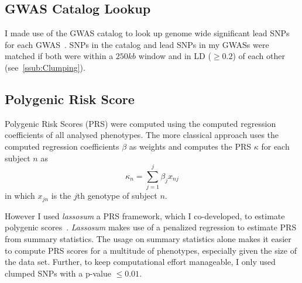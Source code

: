 \subsection{GWAS Catalog Lookup}
\label{sub:GWAS_Cataloge_Lookup}

I made use of the GWAS catalog to look up genome wide significant lead SNPs for each GWAS~\cite{Welter2014}.
SNPs in the catalog and lead SNPs in my GWASs were matched if both were within a $250kb$ window and in LD ($\ge 0.2$) of each other (see~\ref{ssub:Clumping}).

\subsection{Polygenic Risk Score}
\label{sub:prs}

Polygenic Risk Scores (PRS) were computed using the computed regression coefficients of all analysed phenotypes.
The more classical approach uses the computed regression coefficients $\beta$ as weights and computes the PRS $\kappa$ for each subject $n$ as
\begin{equation}
	\kappa_n = \sum^j_{j=1} \beta_j x_{nj}
\end{equation}
in which $x_{jn}$ is the $j$th genotype of subject $n$.

However I used \textit{lassosum} a PRS framework, which I co-developed, to estimate polygenic scores~\cite{Mak2016}.
\textit{Lassosum} makes use of a penalized regression to estimate PRS from summary statistics.
The usage on summary statistics alone makes it easier to compute PRS scores for a multitude of phenotypes, especially given the size of the data set.
Further, to keep computational effort manageable, I only used clumped SNPs with a p-value $\leq 0.01$.
